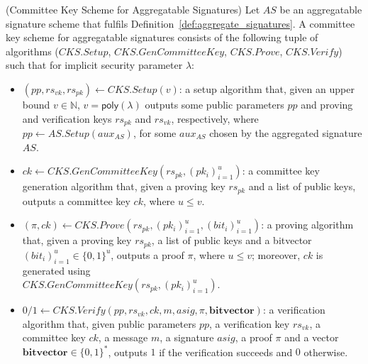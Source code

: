\begin{definition}
\label{def: committee_key} (Committee Key Scheme for Aggregatable Signatures) Let $\mathit{AS}$ be an aggregatable signature scheme that fulfils 
Definition~\ref{def:aggregate_signatures}.  A committee key scheme for aggregatable signatures consists of the following tuple of algorithms 
($\mathit{CKS.Setup}$, $\mathit{CKS.GenCommitteeKey}$, $\mathit{CKS.Prove}$, $\mathit{CKS.Verify}$) 
such that for implicit security parameter $\lambda$: 

\begin{itemize}
\item $(\mathit{pp}, \mathit{rs}_{\mathit{vk}}, \mathit{rs}_{\mathit{pk}}) \leftarrow \mathit{CKS.Setup}(v)$: a setup algorithm that, 
given an upper bound $v \in \mathbb{N}$, $v = \mathsf{poly}(\lambda)$ outputs some public parameters $\mathit{pp}$ and 
proving and verification keys $\mathit{rs}_{\mathit{pk}}$ and $\mathit{rs}_{\mathit{vk}}$, respectively,  
where $\mathit{pp} \leftarrow \mathit{AS.Setup}(\mathit{aux_{\mathit{AS}}})$, for some 
$\mathit{aux_{\mathit{AS}}}$ chosen by the aggregated signature $\mathit{AS}$.

\item $\mathit{ck} \leftarrow \mathit{CKS.GenCommitteeKey}(\mathit{rs}_{\mathit{pk}}, (\mathit{pk_i})_{i=1}^u)$: a committee key generation algorithm that, 
given a proving key $\mathit{rs}_{\mathit{pk}}$ and a list of public keys, 
outputs a committee key $\mathit{ck}$, where $u \leq v$.

\item $(\pi, \mathit{ck}) \leftarrow \mathit{CKS.Prove}(\mathit{rs}_{\mathit{pk}}, (\mathit{pk_i})_{i=1}^u, (\mathit{bit_i})_{i=1}^u)$: a proving algorithm that, 
given a proving key $\mathit{rs}_{\mathit{pk}}$, a list of public keys and a bitvector $(\mathit{bit_i})_{i=1}^u \in \{0,1\}^u$,  
outputs a proof $\pi$, where $u \leq v$; moreover, $\mathit{ck}$ is generated using \\ $\mathit{CKS.GenCommitteeKey}(\mathit{rs}_{\mathit{pk}}, (\mathit{pk_i})_{i=1}^u)$.
 
\item $0/1 \leftarrow \mathit{CKS.Verify}(\mathit{pp}, \mathit{rs}_{\mathit{vk}}, \mathit{ck}, m, \mathit{asig}, \pi, \mathbf{bitvector})$: a verification algorithm that, 
given public parameters $\mathit{pp}$, a verification key $\mathit{rs}_{\mathit{vk}}$, a committee key $\mathit{ck}$, a message $m$, a 
signature $\mathit{asig}$, a proof $\pi$ and a vector \\ $\mathbf{bitvector} \in \{0,1\}^*$, 
outputs $1$ if the verification succeeds and $0$ otherwise. 
\end{itemize}


\end{definition}
